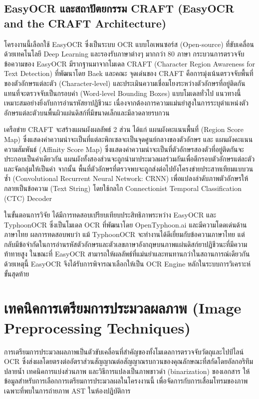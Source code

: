 \subsection{EasyOCR และสถาปัตยกรรม CRAFT (EasyOCR and the CRAFT Architecture)}

โครงงานนี้เลือกใช้ EasyOCR \cite{jaidedai2024easyocr} ซึ่งเป็นระบบ OCR แบบโอเพนซอร์ส (Open-source) ที่ขับเคลื่อนด้วยเทคโนโลยี Deep Learning และรองรับภาษาต่างๆ มากกว่า 80 ภาษา กระบวนการตรวจจับข้อความของ EasyOCR มีรากฐานมาจากโมเดล CRAFT (Character Region Awareness for Text Detection) ที่พัฒนาโดย Baek และคณะ \cite{baek2019craft} จุดเด่นของ CRAFT คือการมุ่งเน้นตรวจจับพื้นที่ของตัวอักษรแต่ละตัว (Character-level) และประเมินความเชื่อมโยงระหว่างตัวอักษรที่อยู่ติดกัน แทนที่จะตรวจจับเป็นกรอบคำ (Word-level Bounding Boxes) แบบโมเดลทั่วไป แนวทางนี้เหมาะสมอย่างยิ่งกับการอ่านรหัสยาปฏิชีวนะ เนื่องจากต้องการความแม่นยำสูงในการระบุตำแหน่งตัวอักษรแต่ละตัวบนพื้นผิวแผ่นดิสก์ที่มีขนาดเล็กและมีลวดลายรบกวน

เครือข่าย CRAFT จะสร้างแผนผังผลลัพธ์ 2 ส่วน ได้แก่ แผนผังคะแนนพื้นที่ (Region Score Map) ซึ่งแสดงค่าความน่าจะเป็นที่แต่ละพิกเซลจะเป็นจุดศูนย์กลางของตัวอักษร และ แผนผังคะแนนความสัมพันธ์ (Affinity Score Map) ซึ่งแสดงค่าความน่าจะเป็นที่ตัวอักษรสองตัวที่อยู่ติดกันจะประกอบเป็นคำเดียวกัน แผนผังทั้งสองส่วนจะถูกนำมาประมวลผลร่วมกันเพื่อตีกรอบตัวอักษรแต่ละตัวและจัดกลุ่มให้เป็นคำ จากนั้น พื้นที่ตัวอักษรที่ตรวจพบจะถูกส่งต่อไปยังโครงข่ายประสาทเทียมแบบวนซ้ำ (Convolutional Recurrent Neural Network: CRNN) เพื่อแปลงลำดับภาพตัวอักษรให้กลายเป็นข้อความ (Text String) โดยใช้กลไก Connectionist Temporal Classification (CTC) Decoder

ในขั้นตอนการวิจัย ได้มีการทดสอบเปรียบเทียบประสิทธิภาพระหว่าง EasyOCR \cite{jaidedai2024easyocr} และ TyphoonOCR \cite{typhoonocr2025} ซึ่งเป็นโมเดล OCR ที่พัฒนาโดย OpenTyphoon.ai และมีความโดดเด่นด้านภาษาไทย ผลการทดสอบพบว่า แม้ TyphoonOCR จะทำงานได้ดีเยี่ยมกับข้อความภาษาไทย แต่กลับมีข้อจำกัดในการอ่านรหัสตัวอักษรและตัวเลขภาษาอังกฤษบนภาพแผ่นดิสก์ยาปฏิชีวนะที่มีความท้าทายสูง ในขณะที่ EasyOCR สามารถให้ผลลัพธ์ที่แม่นยำและทนทานกว่าในสถานการณ์เดียวกัน \cite{baek2019craft,jaidedai2024easyocr} ด้วยเหตุนี้ EasyOCR จึงได้รับการพิจารณาเลือกให้เป็น OCR Engine หลักในระบบการวิเคราะห์ขั้นสุดท้าย

\section{เทคนิคการเตรียมการประมวลผลภาพ (Image Preprocessing Techniques)}

การเตรียมการประมวลผลภาพเป็นตัวขับเคลื่อนที่สำคัญของทั้งโมเดลการตรวจจับวัตถุและไปป์ไลน์ OCR ซึ่งส่งผลโดยตรงต่ออัตราส่วนสัญญาณต่อสัญญาณรบกวนของคุณลักษณะที่สกัดโดยอัลกอริทึมปลายน้ำ \cite{qi2021image_enhancement} เทคนิคการแบ่งส่วนภาพ \cite{jasim2021segmentation,dhanachandra2015} และวิธีการแปลงเป็นภาพขาวดำ (binarization) ของเอกสาร \cite{yang2024binarization} ให้ข้อมูลสำหรับการเลือกการเตรียมการประมวลผลในโครงงานนี้ เพื่อจัดการกับการเสื่อมโทรมของภาพเฉพาะที่พบในการถ่ายภาพ AST ในห้องปฏิบัติการ

